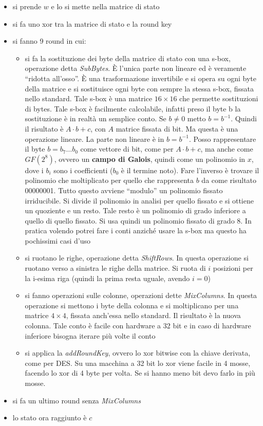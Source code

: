\documentclass[a4paper,12pt, oneside]{book}
\begin{document}
\begin{itemize}
  \item si prende $w$ e lo si mette nella matrice di stato
  \item si fa uno xor tra la matrice di stato e la round key
  \item si fanno 9 round in cui:
  \begin{itemize}
    \item si fa la sostituzione dei byte della matrice di stato con una s-box,
    operazione detta \textit{SubBytes}. È l'unica parte non lineare ed è
    veramente ``ridotta all'osso''. È una trasformazione invertibile e si opera
    su ogni byte della matrice e si sostituisce ogni byte con sempre la stessa
    s-box, fissata nello standard. Tale s-box è una matrice $16\times 16$ che
    permette sostituzioni di bytes. Tale s-box è facilmente calcolabile, infatti
    preso il byte b la sostituzione è in realtà un semplice conto. Se $b\neq 0$
    metto $b=b^{-1}$. Quindi il risultato è $A\cdot b+c$, con $A$ matrice
    fissata di bit. Ma questa è una operazione lineare. La parte non lineare è
    in $b=b^{-1}$. Posso rappresentare il byte $b=b_7\ldots b_0$ come vettore di
    bit, come per 
    $A\cdot b+c$, ma anche come $GF(2^8)$, ovvero un \textbf{campo di Galois},
    quindi come un polinomio in $x$, dove i $b_i$ sono i coefficienti ($b_0$ è
    il termine noto). Fare l'inverso è trovare il polinomio che moltiplicato per
    quello che rappresenta $b$ da come risultato 00000001. Tutto questo avviene
    ``modulo'' un polinomio fissato irriducibile. Si divide il polinomio in
    analisi per quello fissato e si ottiene un quoziente e un resto. Tale
    resto è un polinomio di grado inferiore a quello di quello fissato. Si usa
    quindi un polinomio fissato di grado 8. In pratica volendo potrei fare i
    conti anziché usare la s-box ma questo ha pochissimi casi d'uso
    \item si ruotano le righe, operazione detta \textit{ShiftRows}. In questa
    operazione si ruotano verso a sinistra le righe della matrice. Si ruota di
    $i$ posizioni per la i-esima riga (quindi la prima resta uguale, avendo
    $i=0$) 
    \item si fanno operazioni sulle colonne, operazioni dette
    \textit{MixColumns}. In questa operazione si mettono i byte della colonna e
    si moltiplicano per una matrice $4\times 4$, fissata anch'essa nello
    standard. Il risultato è la nuova 
    colonna. Tale conto è facile con hardware a 32 bit e in caso di hardware
    inferiore bisogna iterare più volte il conto 
    \item si applica la \textit{addRoundKey}, ovvero lo xor bitwise con la
    chiave derivata, come per DES. Su una macchina a 32 bit lo xor viene facile
    in 4 mosse, facendo lo xor di 4 byte per volta. Se si hanno meno bit devo
    farlo in più mosse.   
  \end{itemize}
  \item si fa un ultimo round senza \textit{MixColumns}
  \item lo stato ora raggiunto è $c$
\end{itemize}
\end{document}
